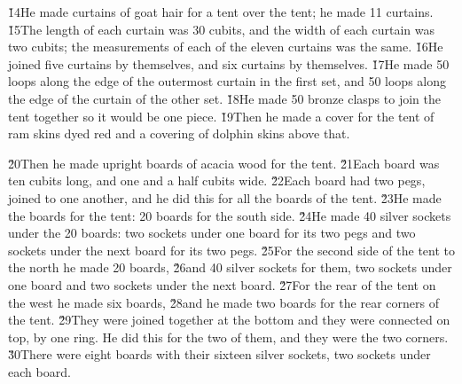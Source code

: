\v{14}He made curtains of goat hair for a tent over the tent; he made 11 curtains. \v{15}The length of each curtain was 30 cubits, and the width of each curtain was two cubits; the measurements of each of the eleven curtains was the same. \v{16}He joined five curtains by themselves, and six curtains by themselves. \v{17}He made 50 loops along the edge of the outermost curtain in the first set, and 50 loops along the edge of the curtain of the other set. \v{18}He made 50 bronze clasps to join the tent together so it would be one piece. \v{19}Then he made a cover for the tent of ram skins dyed red and a covering of dolphin skins above that.

\v{20}Then he made upright boards of acacia wood for the tent. \v{21}Each board was ten cubits long, and one and a half cubits wide. \v{22}Each board had two pegs, joined to one another, and he did this for all the boards of the tent. \v{23}He made the boards for the tent: 20 boards for the south side. \v{24}He made 40 silver sockets under the 20 boards: two sockets under one board for its two pegs and two sockets under the next board for its two pegs. \v{25}For the second side of the tent to the north he made 20 boards, \v{26}and 40 silver sockets for them, two sockets under one board and two sockets under the next board. \v{27}For the rear of the tent on the west he made six boards, \v{28}and he made two boards for the rear corners of the tent. \v{29}They were joined together at the bottom and they were connected on top, by one ring. He did this for the two of them, and they were the two corners. \v{30}There were eight boards with their sixteen silver sockets, two sockets under each board.

